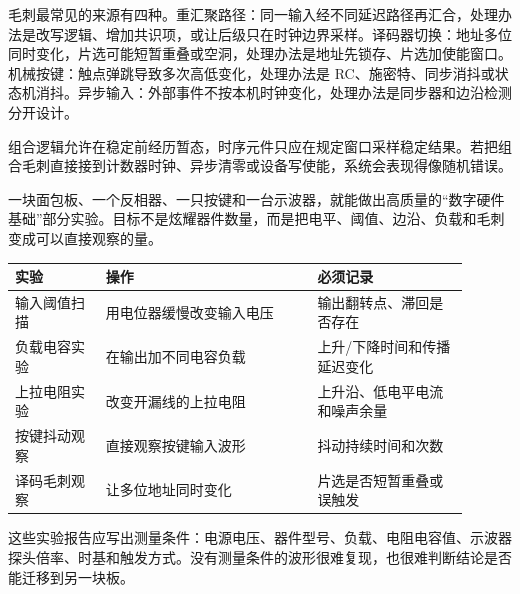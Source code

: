 毛刺最常见的来源有四种。重汇聚路径：同一输入经不同延迟路径再汇合，处理办法是改写逻辑、增加共识项，或让后级只在时钟边界采样。译码器切换：地址多位同时变化，片选可能短暂重叠或空洞，处理办法是地址先锁存、片选加使能窗口。机械按键：触点弹跳导致多次高低变化，处理办法是 RC、施密特、同步消抖或状态机消抖。异步输入：外部事件不按本机时钟变化，处理办法是同步器和边沿检测分开设计。

组合逻辑允许在稳定前经历暂态，时序元件只应在规定窗口采样稳定结果。若把组合毛刺直接接到计数器时钟、异步清零或设备写使能，系统会表现得像随机错误。

一块面包板、一个反相器、一只按键和一台示波器，就能做出高质量的“数字硬件基础”部分实验。目标不是炫耀器件数量，而是把电平、阈值、边沿、负载和毛刺变成可以直接观察的量。

\begin{longtable}{L{0.18\linewidth}L{0.42\linewidth}L{0.3\linewidth}}
\toprule
实验 & 操作 & 必须记录 \\
\midrule
输入阈值扫描 & 用电位器缓慢改变输入电压 & 输出翻转点、滞回是否存在 \\\tablerowrule
负载电容实验 & 在输出加不同电容负载 & 上升/下降时间和传播延迟变化 \\\tablerowrule
上拉电阻实验 & 改变开漏线的上拉电阻 & 上升沿、低电平电流和噪声余量 \\\tablerowrule
按键抖动观察 & 直接观察按键输入波形 & 抖动持续时间和次数 \\\tablerowrule
译码毛刺观察 & 让多位地址同时变化 & 片选是否短暂重叠或误触发 \\
\bottomrule
\end{longtable}

这些实验报告应写出测量条件：电源电压、器件型号、负载、电阻电容值、示波器探头倍率、时基和触发方式。没有测量条件的波形很难复现，也很难判断结论是否能迁移到另一块板。























































